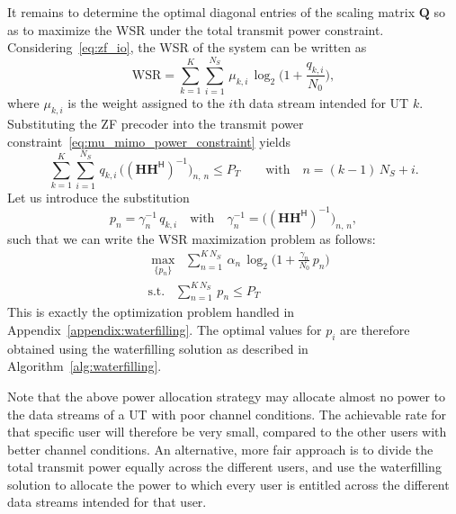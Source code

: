 It remains to determine the optimal diagonal entries of the scaling matrix $\mathbf{Q}$ so as to maximize the \acf{WSR} under the total transmit power constraint.
Considering~\eqref{eq:zf_io}, the \ac{WSR} of the system can be written as
\begin{equation}
\label{eq:zf_wsr}
    \mathrm{WSR} = \sum_{k=1}^{K} \sum_{i=1}^{N_S} \, \mu_{k, i} \, \log_2\big(1 + \frac{q_{k, i}}{N_0}\big),
\end{equation}
where $\mu_{k, i}$ is the weight assigned to the $i$th data stream intended for \ac{UT} $k$.
Substituting the \ac{ZF} precoder into the transmit power constraint~\eqref{eq:mu_mimo_power_constraint} yields %
\begin{equation}
\label{eq:zf_power_constraint}
    \sum_{k=1}^{K} \sum_{i=1}^{N_S} \, q_{k, i} \, \big((\mathbf{H} \mathbf{H}^{\mathsf{H}})^{-1}\big)_{n,\,n} \leq P_T \qquad \text{with} \quad n = (k-1)\,N_S + i.
\end{equation}
Let us introduce the substitution
\begin{equation}
    p_n = \gamma_n^{-1} \, q_{k, i} \quad \text{with} \quad \gamma^{-1}_n = \big((\mathbf{H} \mathbf{H}^{\mathsf{H}})^{-1}\big)_{n,\,n},
\end{equation}
such that we can write the \ac{WSR} maximization problem as follows:
\begin{equation}
\begin{aligned}
    &\underset{\{p_n\}}{\max} \;\; \sum_{n=1}^{K\, N_S} \, \alpha_n \, \log_2\big(1 + \frac{\gamma_n}{N_0} \, p_n \big) \\
    &\mathrm{s. t.} \;\;\; \sum_{n=1}^{K\, N_S} \, p_n \leq P_T
\end{aligned}
\end{equation}
This is exactly the optimization problem handled in Appendix~\ref{appendix:waterfilling}.
The optimal values for $p_i$ are therefore obtained using the waterfilling solution as described in Algorithm~\ref{alg:waterfilling}.

Note that the above power allocation strategy may allocate almost no power to the data streams of a \ac{UT} with poor channel conditions.
The achievable rate for that specific user will therefore be very small, compared to the other users with better channel conditions.
An alternative, more fair approach is to divide the total transmit power equally across the different users, and use the waterfilling solution to allocate the power to which every user is entitled across the different data streams intended for that user.


